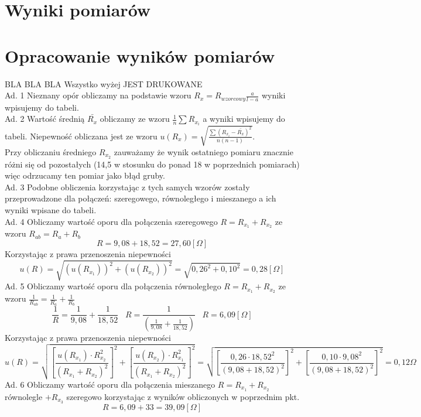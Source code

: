 \documentclass[a4paper,10pt,twoside]{article}
\begin{document}
	
	
	\section{Wyniki pomiarów}
	
	
	\section{Opracowanie wyników pomiarów}

	BLA BLA BLA Wszystko wyżej JEST DRUKOWANE
\noindent \\
	Ad. 1 Nieznany opór obliczamy na podstawie wzoru $R_x = R_{wzorcowy} \frac{a}{l-a}$ wyniki wpisujemy do tabeli. \\
	Ad. 2 Wartość średnią $\bar{R_x}$ obliczamy ze wzoru $\frac{1}{n} \sum R_{x_i}$ a wyniki wpisujemy do tabeli. Niepewność obliczana jest ze wzoru $u(R_x) = \sqrt{\frac{\sum(R_{x_i} - \bar{R_x})^2}{n(n-1)}}$. \\ Przy obliczaniu średniego $R_{x_2}$ zauważamy że wynik ostatniego pomiaru znacznie różni się od pozostałych (14,5 w stosunku do ponad 18 w poprzednich pomiarach) więc odrzucamy ten pomiar jako błąd gruby.\\
	Ad. 3 Podobne obliczenia korzystając z tych samych wzorów zostały przeprowadzone dla połączeń: szeregowego, równoległego i mieszanego a ich wyniki wpisane do tabeli.\\
	Ad. 4 Obliczamy wartość oporu dla połączenia szeregowego $R = R_{x_1} + R_{x_2}$ ze wzoru $R_{ab} = R_a + R_b$ $$ R = 9,08 + 18,52 = 27,60[ \Omega]$$
	Korzystając z prawa przenoszenia niepewności $$u(R) =\sqrt{(u(R_{x_1}))^2 + (u(R_{x_2}))^2} = \sqrt{0,26^2 + 0,10^2} = 0,28[\Omega]$$
	Ad. 5 Obliczamy wartość oporu dla połączenia równoległego $R = R_{x_1} + R_{x_2}$ ze wzoru $\frac{1}{R_{ab}} = \frac{1}{R_a} + \frac{1}{R_b}$ $$ \frac{1}{R} = \frac{1}{9,08} + \frac{1}{18,52} \hspace{10pt} R = \frac{1}{(\frac{1}{9,08} + \frac{1}{18,52})} \hspace{10pt} R=6,09[ \Omega]$$
	Korzystając z prawa przenoszenia niepewności $$ u(R) = \sqrt{\left [\frac{u(R_{x_1})\cdot R_{x_2}^2}{(R_{x_1} + R_{x_2})^2} \right ]  ^2 + \left [\frac{u(R_{x_2})\cdot R_{x_1}^2}{(R_{x_1} + R_{x_2})^2} \right] ^2} =
	 \sqrt{\left [\frac{0,26\cdot 18,52^2}{(9,08 + 18,52)^2} \right ]  ^2 + \left [\frac{0,10\cdot 9,08^2}{(9,08 + 18,52)^2} \right] ^2} =
	  0,12\Omega$$
	Ad. 6 Obliczamy wartość oporu dla połączenia mieszanego $R = R_{x_1} + R_{x_2}$ równolegle $+ R_{x_3}$ szeregowo korzystając z wyników obliczonych w poprzednim pkt. $$R = 6,09 + 33 = 39,09[\Omega]$$
\end{document}
